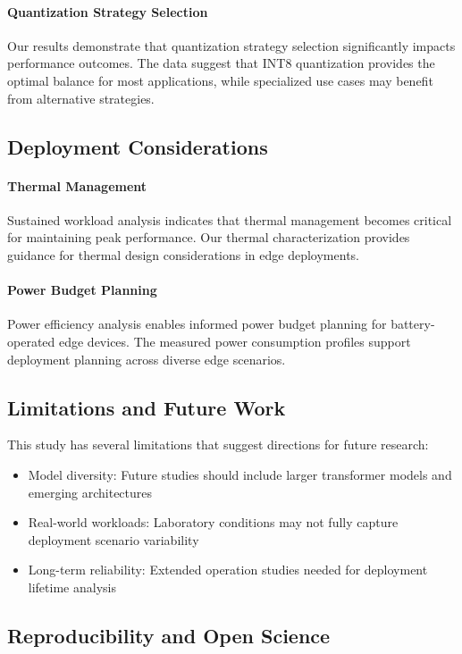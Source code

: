 \documentclass[conference]{IEEEtran}
\begin{document}
\paragraph{Quantization Strategy Selection} Our results demonstrate that quantization strategy selection significantly impacts performance outcomes. The data suggest that INT8 quantization provides the optimal balance for most applications, while specialized use cases may benefit from alternative strategies.

\subsection{Deployment Considerations}

\paragraph{Thermal Management} Sustained workload analysis indicates that thermal management becomes critical for maintaining peak performance. Our thermal characterization provides guidance for thermal design considerations in edge deployments.

\paragraph{Power Budget Planning} Power efficiency analysis enables informed power budget planning for battery-operated edge devices. The measured power consumption profiles support deployment planning across diverse edge scenarios.

\subsection{Limitations and Future Work}

This study has several limitations that suggest directions for future research:

\begin{itemize}
\item Model diversity: Future studies should include larger transformer models and emerging architectures
\item Real-world workloads: Laboratory conditions may not fully capture deployment scenario variability
\item Long-term reliability: Extended operation studies needed for deployment lifetime analysis
\end{itemize}

\subsection{Reproducibility and Open Science}
\end{document}
